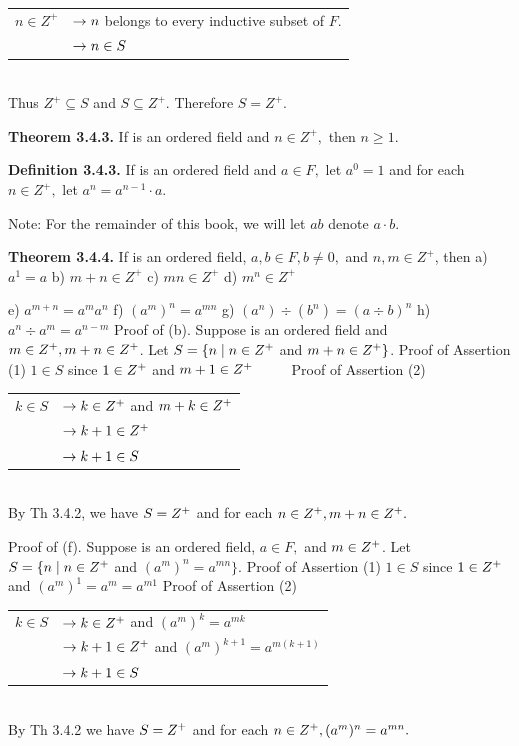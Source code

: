 \begin{large}
\begin{tabular}{r l}
$n \in Z^{+}$& $\to n$ belongs to every inductive subset of $F$.\\
&$\to n\in S$\\
\end{tabular}\\
Thus $Z^{+} \subseteq S$ and $S \subseteq Z^{+}.$ Therefore $S = Z^{+}.$ \nl

\textbf{Theorem 3.4.3.} If \of is an ordered field and $n\in Z^{+},$ then $n \geq 1.$\nl

\textbf{Definition 3.4.3.} If \of is an ordered field and $a\in F,$ let $a^{0} = 1$ and for each $n\in Z^{+},$ let $a^{n} =a^{n-1}\cdot a.$\nl

Note: For the remainder of this book, we will let $ab$ denote $a\cdot b.$\nl

\textbf{Theorem 3.4.4.} If \of  is an ordered field, $a,b\in F, b \neq 0,$ and $n,m\in Z^{+}$, then \nl
a) $a^{1} = a$ \nl
b) $m + n \in Z^{+}$\nl
c) $mn\in Z^{+} $\nl
d) $m^{n}\in Z^{+} $\nl

\newpage


e) $a^{m+n} = a^{m}a^{n}$\nl
f) $(a^{m})^n = a^{mn} $\nl
g) $(a^{n})\div (b^{n})=(a\div b)^{n}$\nl
h) $a^{n} \div a^{m} = a^{n - m}$\nl
Proof of (b). Suppose \of  is an ordered field and $ m \in Z^{+} , m + n \in Z^{+} $.  \nl
Let $S = \{ n \mid n \in Z^{+}$ and $ m + n \in Z^{+} \}$.\nl
\qqu Proof of Assertion (1)\nl
$1 \in S$ since $1\in Z^{+}$ and $m + 1\in Z^{+}$\nl
$\quad \quad$ Proof of Assertion (2)\nl
\begin{tabular}{rl}
$k \in S$&$\to  k\in Z^{+} $ and $m + k \in Z^{+}$\\
&$\to k + 1 \in Z^{+}$\\ %
&$\to k+1\in S$\\
\end{tabular}\\
By Th 3.4.2, we have $S=Z^{+}$ and for each $n\in Z^{+}, m + n\in Z^{+} .$\nl

Proof of (f). Suppose \of is an ordered field, $a\in F,$ and $m\in Z^{+}$. Let $S= \{n \mid n \in Z^{+} $ and $(a^{m})^{n} = a^{mn}\}.$ \nl
\qqu Proof of Assertion (1)\nl
$1\in S$ since $1 \in Z^{+}$ and $(a^{m})^{1} = a^{m} = a^{m1} $\nl
\qqu Proof of Assertion (2)\nl
\begin{tabular}{r l}
$k \in S$&$\to  k\in Z^{+} $ and $(a^{m})^{k} = a^{mk}$\\
&$\to k+1 \in Z^{+}$ and $(a^{m})^{k+1} =  a^{m(k+1)}$\\
&$\to k+1\in S$\\
\end{tabular}\\
By Th 3.4.2 we have $S = Z^{+}$ and for each $n \in Z^{+}, (a^{m})^{n} = a^{mn}.$\nl


\end{large}
